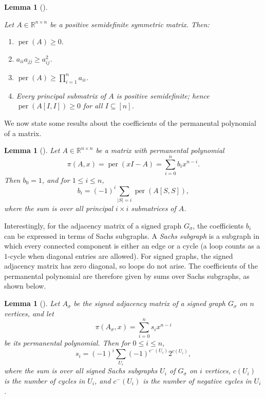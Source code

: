 \documentclass[11pt]{article}
\DeclareMathOperator{\per}{per}
\theoremstyle{plain}
\newtheorem{lemma}[theorem]{Lemma}
\theoremstyle{definition}
\theoremstyle{remark}
\begin{document}
\begin{lemma}[\cite{Marcus1963ThePA}]\label{theorem:psd-properties}

Let \(A \in \mathbb{R}^{n \times n}\) be a positive semidefinite symmetric matrix.
Then:
\begin{enumerate}
  \item \(\per(A) \ge 0\).
  \item \(a_{ii}a_{jj} \ge a_{ij}^2\).
  \item \(\per(A) \ge \prod_{i=1}^n a_{ii}\).
  \item Every principal submatrix of \(A\) is positive semidefinite; hence
  \(\per(A[I,I]) \ge 0\) for all \(I \subseteq [n]\).
\end{enumerate}
\end{lemma}



We now state some results about the coefficients of the permanental polynomial of a matrix.

\begin{lemma}[\cite{minc1984permanents}]\label{lemma:coeff-principal} 
Let \(A \in \mathbb{R}^{n \times n}\) be a matrix
with permanental polynomial
\[
\pi(A, x) =\per(xI-A)= \sum_{i=0}^n b_i x^{n-i}.
\]
Then \( b_0 = 1 \), and for \( 1 \leq i \leq n \),
\[
b_i = (-1)^i \sum_{|S| = i} \operatorname{per}(A[S, S]),
\]
where the sum is over all principal \( i \times i \) submatrices of \( A \).
\end{lemma}

Interestingly, for the adjacency matrix of a signed graph $G_{\sigma}$, the coefficients $b_i$ can be expressed in terms of Sachs subgraphs. A \emph{Sachs subgraph} is a subgraph in which every connected component is either
an edge or a cycle (a loop counts as a $1$-cycle when diagonal entries are allowed). For signed graphs, the signed adjacency matrix has zero diagonal, so loops do not arise. The coefficients of the permanental polynomial are therefore given by sums over Sachs subgraphs, as shown below.



\begin{lemma}[\cite{tang2022permanental}]\label{lemma:sachs-signed}
Let \( A_\sigma \) be the signed adjacency matrix of a signed graph \( G_\sigma \) on \( n \) vertices, and let
\[
\pi(A_\sigma,x) = \sum_{i=0}^n s_i x^{n-i}
\]
be its permanental polynomial. Then for \( 0 \leq i \leq n \),
\[
s_i = (-1)^i \sum_{U_i} (-1)^{c^-(U_i)} 2^{c(U_i)},
\]
where the sum is over all signed Sachs subgraphs \( U_i \) of \( G_\sigma \) on \( i \) vertices, \( c(U_i) \) is the number of cycles in \( U_i \), and \( c^-(U_i) \) is the number of negative cycles in \( U_i \).
\end{lemma}
\end{document}
